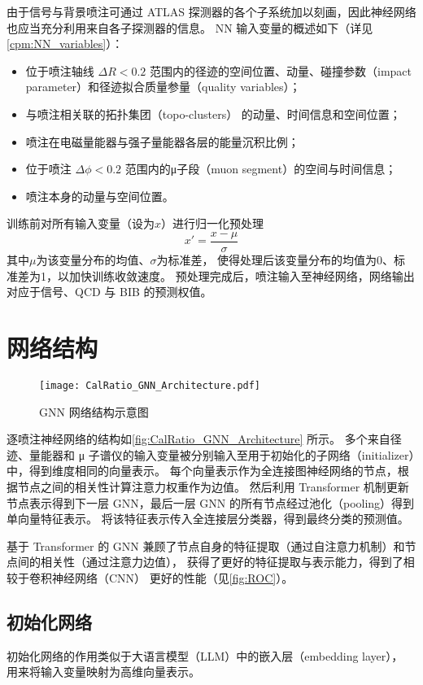 由于信号与背景喷注可通过 ATLAS 探测器的各个子系统加以刻画，因此神经网络也应当充分利用来自各子探测器的信息。
NN 输入变量的概述如下（详见\autoref{cpm:NN_variables}）：
\begin{itemize}
    \item 位于喷注轴线 $\Delta R < 0.2$ 范围内的径迹的空间位置、动量、碰撞参数（impact parameter）和径迹拟合质量参量（quality variables）；
    \item 与喷注相关联的拓扑集团（topo-clusters） 的动量、时间信息和空间位置；
    \item 喷注在电磁量能器与强子量能器各层的能量沉积比例；
    \item 位于喷注 $\Delta \phi < 0.2$ 范围内的μ子段（muon segment）的空间与时间信息；
    \item 喷注本身的动量与空间位置。
\end{itemize}

训练前对所有输入变量（设为$x$）进行归一化预处理
\begin{equation}
    x' = \frac{x-\mu}{\sigma}
\end{equation}
其中$\mu$为该变量分布的均值、$\sigma$为标准差，
使得处理后该变量分布的均值为0、标准差为1，以加快训练收敛速度。
预处理完成后，喷注输入至神经网络，网络输出对应于信号、QCD 与 BIB 的预测权值。


\section{网络结构}
\begin{figure}[ht]
    \centering
    \texttt{[image: CalRatio\_GNN\_Architecture.pdf]}
    \caption{GNN 网络结构示意图}
    \label{fig:CalRatio_GNN_Architecture}
\end{figure}

逐喷注神经网络的结构如\autoref{fig:CalRatio_GNN_Architecture} 所示。
多个来自径迹、量能器和 μ 子谱仪的输入变量被分别输入至用于初始化的子网络（initializer）中，得到维度相同的向量表示。
每个向量表示作为全连接图神经网络的节点，根据节点之间的相关性计算注意力权重作为边值。
然后利用 Transformer 机制更新节点表示得到下一层 GNN，最后一层 GNN 的所有节点经过池化（pooling）得到单向量特征表示。
将该特征表示传入全连接层分类器，得到最终分类的预测值。

基于 Transformer 的 GNN 兼顾了节点自身的特征提取（通过自注意力机制）和节点间的相关性（通过注意力边值），
获得了更好的特征提取与表示能力，得到了相较于卷积神经网络（CNN）\cite{ATLAS:2022zhj} 更好的性能（见\autoref{fig:ROC}）。


\subsection{初始化网络}
初始化网络的作用类似于大语言模型（LLM）中的嵌入层（embedding layer），
用来将输入变量映射为高维向量表示。

